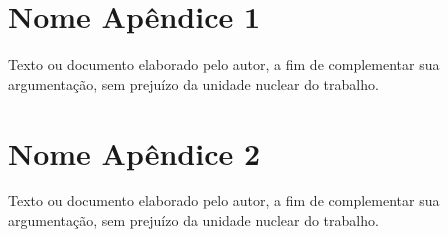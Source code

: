 
\chapter{\texorpdfstring{Nome Apêndice 1}{Nome Apêndice 1}}


Texto ou documento elaborado pelo autor, a fim de complementar sua argumentação, sem prejuízo da unidade nuclear do trabalho. 

\chapter{\texorpdfstring{Nome Apêndice 2}{Nome Apêndice 2}}

Texto ou documento elaborado pelo autor, a fim de complementar sua argumentação, sem prejuízo da unidade nuclear do trabalho. 


%

